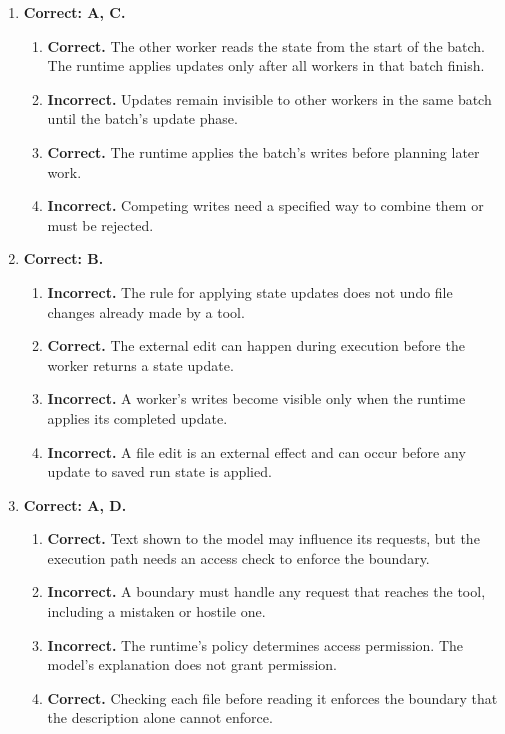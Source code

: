 \begin{enumerate}[start=31,itemsep=0.7\baselineskip]
\item[{\hyperref[exercise:31]{31.}}] \begin{minipage}[t]{\linewidth}
\textbf{Correct: A, C.}
\begin{enumerate}[label=\textnormal{(\Alph*)},leftmargin=*,itemsep=0pt]
\item \textbf{Correct.} The other worker reads the state from the start of the batch. The runtime applies updates only after all workers in that batch finish.
\item \textbf{Incorrect.} Updates remain invisible to other workers in the same batch until the batch's update phase.
\item \textbf{Correct.} The runtime applies the batch's writes before planning later work.
\item \textbf{Incorrect.} Competing writes need a specified way to combine them or must be rejected.
\end{enumerate}
\end{minipage}

\item[{\hyperref[exercise:32]{32.}}] \begin{minipage}[t]{\linewidth}
\textbf{Correct: B.}
\begin{enumerate}[label=\textnormal{(\Alph*)},leftmargin=*,itemsep=0pt]
\item \textbf{Incorrect.} The rule for applying state updates does not undo file changes already made by a tool.
\item \textbf{Correct.} The external edit can happen during execution before the worker returns a state update.
\item \textbf{Incorrect.} A worker's writes become visible only when the runtime applies its completed update.
\item \textbf{Incorrect.} A file edit is an external effect and can occur before any update to saved run state is applied.
\end{enumerate}
\end{minipage}

\item[{\hyperref[exercise:33]{33.}}] \begin{minipage}[t]{\linewidth}
\textbf{Correct: A, D.}
\begin{enumerate}[label=\textnormal{(\Alph*)},leftmargin=*,itemsep=0pt]
\item \textbf{Correct.} Text shown to the model may influence its requests, but the execution path needs an access check to enforce the boundary.
\item \textbf{Incorrect.} A boundary must handle any request that reaches the tool, including a mistaken or hostile one.
\item \textbf{Incorrect.} The runtime's policy determines access permission. The model's explanation does not grant permission.
\item \textbf{Correct.} Checking each file before reading it enforces the boundary that the description alone cannot enforce.
\end{enumerate}
\end{minipage}


\end{enumerate}
